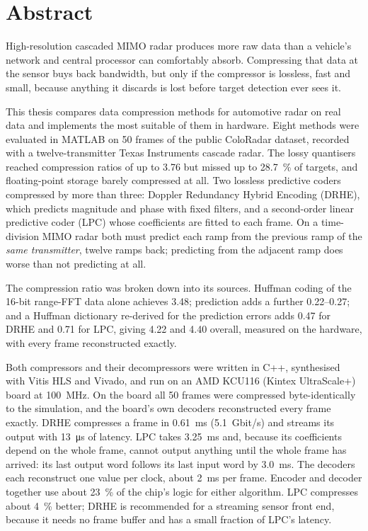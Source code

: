 \chapter*{Abstract}

High-resolution cascaded MIMO radar produces more raw data than a vehicle's
network and central processor can comfortably absorb. Compressing that data at
the sensor buys back bandwidth, but only if the compressor is lossless, fast and
small, because anything it discards is lost before target detection ever sees
it.

This thesis compares data compression methods for automotive radar on real data
and implements the most suitable of them in hardware. Eight methods were
evaluated in MATLAB on 50 frames of the public ColoRadar dataset, recorded with
a twelve-transmitter Texas Instruments cascade radar. The lossy quantisers
reached compression ratios of up to \num{3.76} but missed up to
\SI{28.7}{\percent} of targets, and floating-point storage barely compressed at
all. Two lossless predictive coders compressed by more than three:
Doppler Redundancy Hybrid Encoding (DRHE), which predicts magnitude and phase
with fixed filters, and a second-order linear predictive coder (LPC) whose
coefficients are fitted to each frame. On a time-division MIMO radar both must
predict each ramp from the previous ramp of the \emph{same transmitter}, twelve
ramps back; predicting from the adjacent ramp does worse than not predicting
at all.

The compression ratio was broken down into its sources. Huffman coding of the
16-bit range-FFT data alone achieves \num{3.48}; prediction adds a further
\num{0.22}--\num{0.27}; and a Huffman dictionary re-derived for the prediction
errors adds \num{0.47} for DRHE and \num{0.71} for LPC, giving \num{4.22} and
\num{4.40} overall, measured on the hardware, with every frame reconstructed
exactly.

Both compressors and their decompressors were written in C++, synthesised
with Vitis HLS and Vivado, and run on an AMD KCU116 (Kintex UltraScale+) board
at \SI{100}{\mega\hertz}. On the board all 50 frames were compressed
byte-identically to the simulation, and the board's own decoders reconstructed
every frame exactly. DRHE
compresses a frame in \SI{0.61}{\milli\second} (\SI{5.1}{Gbit/s}) and streams
its output with \SI{13}{\micro\second} of latency. LPC takes
\SI{3.25}{\milli\second} and, because its coefficients depend on the whole
frame, cannot output anything until the whole frame has arrived: its last
output word follows its last input word by \SI{3.0}{\milli\second}. The
decoders each reconstruct one value per clock, about \SI{2}{\milli\second} per
frame. Encoder and decoder together use about \SI{23}{\percent} of the chip's
logic for either algorithm. LPC
compresses about \SI{4}{\percent} better; DRHE is recommended for a streaming
sensor front end, because it needs no frame buffer and has a small fraction of
LPC's latency.

